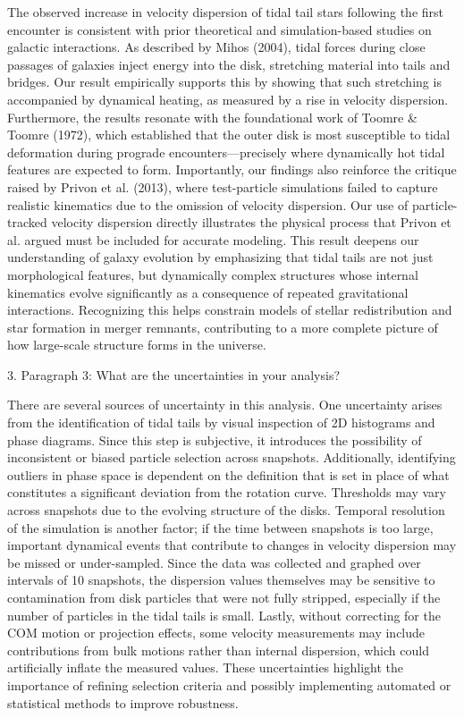 \documentclass[fleqn,usenatbib]{mnras}
\begin{document}
The observed increase in velocity dispersion of tidal tail stars following the first encounter is consistent with prior theoretical and simulation-based studies on galactic interactions. As described by Mihos (2004), tidal forces during close passages of galaxies inject energy into the disk, stretching material into tails and bridges. Our result empirically supports this by showing that such stretching is accompanied by dynamical heating, as measured by a rise in velocity dispersion. Furthermore, the results resonate with the foundational work of Toomre \& Toomre (1972), which established that the outer disk is most susceptible to tidal deformation during prograde encounters—precisely where dynamically hot tidal features are expected to form. Importantly, our findings also reinforce the critique raised by Privon et al. (2013), where test-particle simulations failed to capture realistic kinematics due to the omission of velocity dispersion. Our use of particle-tracked velocity dispersion directly illustrates the physical process that Privon et al. argued must be included for accurate modeling. This result deepens our understanding of galaxy evolution by emphasizing that tidal tails are not just morphological features, but dynamically complex structures whose internal kinematics evolve significantly as a consequence of repeated gravitational interactions. Recognizing this helps constrain models of stellar redistribution and star formation in merger remnants, contributing to a more complete picture of how large-scale structure forms in the universe.

3. Paragraph 3: What are the uncertainties in your analysis?

There are several sources of uncertainty in this analysis. One uncertainty arises from the identification of tidal tails by visual inspection of 2D histograms and phase diagrams. Since this step is subjective, it introduces the possibility of inconsistent or biased particle selection across snapshots. Additionally, identifying outliers in phase space is dependent on the definition that is set in place of what constitutes a significant deviation from the rotation curve. Thresholds may vary across snapshots due to the evolving structure of the disks. Temporal resolution of the simulation is another factor; if the time between snapshots is too large, important dynamical events that contribute to changes in velocity dispersion may be missed or under-sampled. Since the data was collected and graphed over intervals of 10 snapshots, the dispersion values themselves may be sensitive to contamination from disk particles that were not fully stripped, especially if the number of particles in the tidal tails is small. Lastly, without correcting for the COM motion or projection effects, some velocity measurements may include contributions from bulk motions rather than internal dispersion, which could artificially inflate the measured values. These uncertainties highlight the importance of refining selection criteria and possibly implementing automated or statistical methods to improve robustness.





\bsp	%
\label{lastpage}
\end{document}
